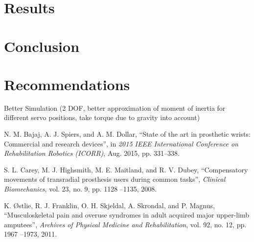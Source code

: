 \documentclass[letterpaper,12pt]{article}
\begin{document}
\section{Results}

\section{Conclusion}

\section{Recommendations}
Better Simulation (2 DOF, better approximation of moment of inertia for different servo positions, take torque due to gravity into account)


\pagebreak

\begin{thebibliography}{99}
N. M. Bajaj, A. J. Spiers, and A. M. Dollar, “State of the art in prosthetic wrists: Commercial and research devices”, in \textit{2015 IEEE International Conference on Rehabilitation Robotics
(ICORR)}, Aug. 2015, pp. 331–338.

S. L. Carey, M. J. Highsmith, M. E. Maitland, and R. V. Dubey, “Compensatory movements
of transradial prosthesis users during common tasks”, \textit{Clinical Biomechanics}, vol. 23, no. 9,
pp. 1128 –1135, 2008.



K. Østlie, R. J. Franklin, O. H. Skjeldal, A. Skrondal, and P. Magnus, “Musculoskeletal pain
and overuse syndromes in adult acquired major upper-limb amputees”, \textit{Archives of Physical
Medicine and Rehabilitation}, vol. 92, no. 12, pp. 1967 –1973, 2011.


\end{thebibliography}
\end{document}

